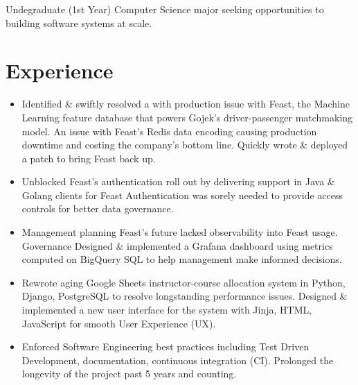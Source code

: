 %
%


\fancyhead{} %


Undegraduate (1st Year) Computer Science major seeking opportunities to building software systems at scale.

\section{Experience}
\begin{itemize}
    \item Identified \& swiftly resolved a with production issue with Feast, the Machine Learning
      feature database that powers Gojek's driver-passenger matchmaking model.
      An issue with Feast's Redis data encoding causing production downtime and 
      costing the company's bottom line. Quickly wrote \& deployed a patch to bring Feast back up.
    \item Unblocked Feast's authentication roll out by delivering
      support in Java \& Golang clients for Feast
      Authentication was sorely needed to provide access controls for better data governance.
    \item Management planning Feast's future lacked observability into Feast usage. Governance
        Designed \& implemented a Grafana dashboard using metrics computed on 
        BigQuery SQL to help management make informed decisions.
\end{itemize}

\begin{itemize}
  \item Rewrote aging Google Sheets instructor-course allocation system in Python, Django, PostgreSQL to resolve longstanding performance issues.
    Designed \& implemented a new user interface for the system with Jinja, HTML, JavaScript for smooth User Experience (UX).
  \item Enforced Software Engineering best practices including Test Driven Development,
    documentation, continuous integration (CI). Prolonged the longevity of the project
    past 5 years and counting.
\end{itemize}

